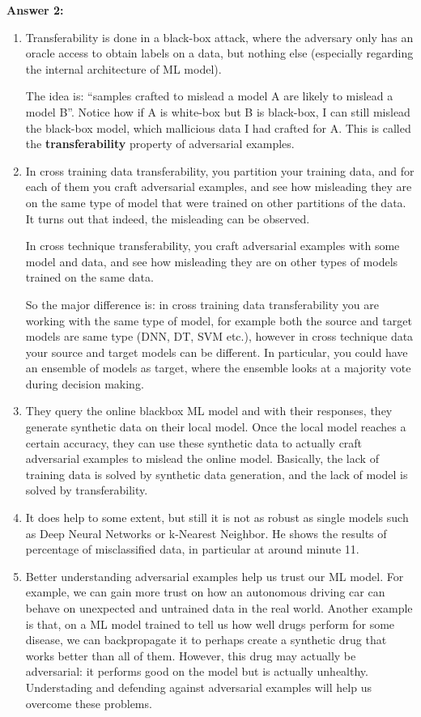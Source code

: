 \documentclass[12pt,reqno]{amsart}
\begin{document}
\textbf{Answer 2:} 
\begin{enumerate}[label=(\alph*)]
\item Transferability is done in a black-box attack, where the adversary only has an oracle access to obtain labels on a data, but nothing else (especially regarding the internal architecture of ML model).

The idea is: ``samples crafted to mislead a model A are likely to mislead a model B''. Notice how if A is white-box but B is black-box, I can still mislead the black-box model, which mallicious data I had crafted for A. This is called the \textbf{transferability} property of adversarial examples.

\item In cross training data transferability, you partition your training data, and for each of them you craft adversarial examples, and see how misleading they are on the same type of model that were trained on other partitions of the data. It turns out that indeed, the misleading can be observed.

In cross technique transferability, you craft adversarial examples with some model and data, and see how misleading they are on other types of models trained on the same data.

So the major difference is: in cross training data transferability you are working with the same type of model, for example both the source and target models are same type (DNN, DT, SVM etc.), however in cross technique data your source and target models can be different. In particular, you could have an ensemble of models as target, where the ensemble looks at a majority vote during decision making.

\item They query the online blackbox ML model and with their responses, they generate synthetic data on their local model. Once the local model reaches a certain accuracy, they can use these synthetic data to actually craft adversarial examples to mislead the online model. Basically, the lack of training data is solved by synthetic data generation, and the lack of model is solved by transferability.

\item It does help to some extent, but still it is not as robust as single models such as Deep Neural Networks or k-Nearest Neighbor. He shows the results of percentage of misclassified data, in particular at around minute 11. 

\item Better understanding adversarial examples help us trust our ML model. For example, we can gain more trust on how an autonomous driving car can behave on unexpected and untrained data in the real world. Another example is that, on a ML model trained to tell us how well drugs perform for some disease, we can backpropagate it to perhaps create a synthetic drug that works better than all of them. However, this drug may actually be adversarial: it performs good on the model but is actually unhealthy. Understading and defending against adversarial examples will help us overcome these problems.
\end{enumerate}
\end{document}
